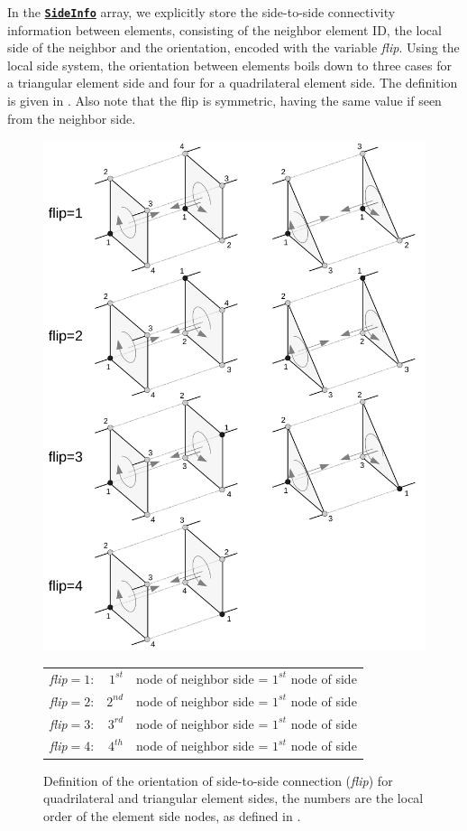 \documentclass[a4paper,headsepline]{scrreprt}
\newcommand\rf[1]{\prettyref{#1}}
\newcommand\ttbf[1]{\texttt{\textbf{#1}}}
\newcommand\SideInfo{\hyperlink{SideInfo}{\ttbf{SideInfo}}\xspace}
\begin{document}
In the \SideInfo array, we explicitly store the side-to-side connectivity information between elements, consisting of the neighbor element ID, the local side of the neighbor  and the orientation, encoded with the variable \emph{flip}. 
Using the local side system, the orientation between elements boils down to three cases for a triangular element side and four for a quadrilateral element side. The definition is given in  \rf{fig:flip}. Also note that the flip is symmetric, having the same value if seen from the neighbor side.
%
\begin{figure}[h!]
\centering
\includegraphics[height=0.64\textheight]{pics/flip.pdf} \\
\begin{tabular}{lrl}
\emph{flip}$=1$: & $1^{st}$ & node of neighbor side = $1^{st}$ node of side \\
\emph{flip}$=2$: & $2^{nd}$ & node of neighbor side = $1^{st}$ node of side \\
\emph{flip}$=3$: & $3^{rd}$ & node of neighbor side = $1^{st}$ node of side \\
\emph{flip}$=4$: & $4^{th}$ & node of neighbor side = $1^{st}$ node of side \\
\end{tabular}

\caption{Definition of the orientation of side-to-side connection (\emph{flip}) for quadrilateral and triangular element sides, the numbers are the local order of the element side nodes, as defined in \rf{sec:CGNS}. }
\label{fig:flip}
\end{figure}
\end{document}
